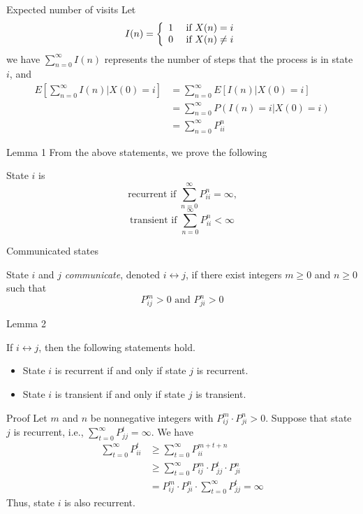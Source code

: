 \documentclass{beamer}
\begin{document}
\begin{frame}{Expected number of visits}
	Let 
	\[
	I(n) = \left\{
	\begin{array}{l l}
		1 & ~\text{if $X(n) = i$}\\
		0 & ~\text{if $X(n) \neq i$} \\
	\end{array} \right.
	\]
	we have $\sum_{n=0}^\infty I(n)$ represents the number of steps that the process is in state $i$, and
	\begin{align*}
	E\left[ \sum_{n=0}^\infty I(n)|X(0) = i \right] & = \sum_{n=0}^\infty E[I(n)|X(0)=i] \\
	& = \sum_{n=0}^\infty P(I(n)=i|X(0)=i) \\
	& = \sum_{n=0}^\infty P^n_{ii}
	\end{align*}
\end{frame}

\begin{frame}{Lemma 1}
	From the above statements, we prove the following
	\begin{lemma}
	State $i$ is 
	\[
	\text{recurrent if } \sum_{n=0}^\infty P^n_{ii} = \infty \text{,}
	\]
	\[
	\text{transient if } \sum_{n=0}^\infty P^n_{ii} < \infty
	\]
	\end{lemma}
\end{frame}

\begin{frame}{Communicated states}
	\begin{definition}
	State $i$ and $j$ \textit{communicate}, denoted $i \leftrightarrow j$,
	if there exist integers $m \geq 0$ and $n \geq 0$ such that
	\[
	P^m_{ij} > 0 \text{ and } P^n_{ji} > 0
	\]
	\end{definition}
\end{frame}

\begin{frame}{Lemma 2}
	\begin{lemma}
	If $i \leftrightarrow j$, then the following statements hold.
	\begin{itemize}
	\item State $i$ is recurrent if and only if state $j$ is recurrent.
	\item State $i$ is transient if and only if state $j$ is transient.
	\end{itemize}
	\end{lemma}
\end{frame}

\begin{frame}{Proof}
	Let $m$ and $n$ be nonnegative integers with $P^m_{ij} \cdot P^n_{ji} > 0$.
	Suppose that state $j$ is recurrent, i.e., $\sum_{t=0}^\infty P^t_{jj} = \infty$.
	We have
	\begin{align*}
	\sum_{t=0}^\infty P^t_{ii} & \geq \sum_{t=0}^\infty P^{m+t+n}_{ii} \\
	& \geq \sum_{t=0}^\infty P^m_{ij} \cdot P^t_{jj} \cdot P^n_{ji} \\
	& = P^m_{ij} \cdot P^n_{ji} \cdot \sum_{t=0}^\infty P^t_{jj} = \infty
	\end{align*}
	Thus, state $i$ is also recurrent.
\end{frame}
\end{document}
